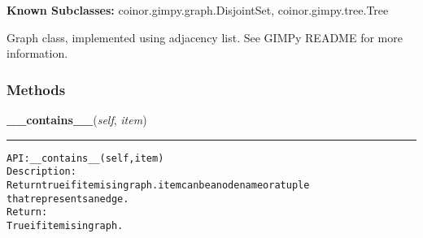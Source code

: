 \textbf{Known Subclasses:}
coinor.gimpy.graph.DisjointSet,
    coinor.gimpy.tree.Tree

Graph class, implemented using adjacency list. See GIMPy README for more 
information.



  \subsubsection{Methods}

    \label{coinor:gimpy:graph:Graph:__contains__}

    \vspace{0.5ex}

\hspace{.8\funcindent}\begin{boxedminipage}{\funcwidth}

    \raggedright \textbf{\_\_contains\_\_}(\textit{self}, \textit{item})

    \vspace{-1.5ex}

    \rule{\textwidth}{0.5\fboxrule}
\setlength{\parskip}{2ex}
\begin{alltt}

API: \_\_contains\_\_(self, item)
Description:
Return true if item is in graph. item can be a node name or a tuple
that represents an edge.
Return:
    True if item is in graph.
\end{alltt}

\setlength{\parskip}{1ex}
    \end{boxedminipage}

    \vspace{0.5ex}

